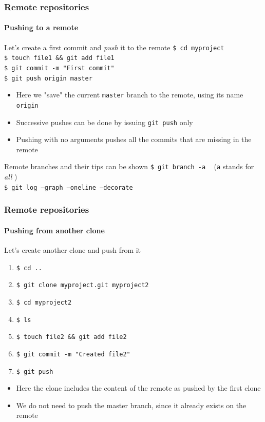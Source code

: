 \begin{frame}
\frametitle{Remote repositories}
\framesubtitle{Pushing to a remote}

\begin{block}{Let's create a first commit and {\em push} it to the remote}
\texttt{\$ cd myproject} \\
\texttt{\$ touch file1 \&\& git add file1} \\
\texttt{\$ git commit -m "First commit"} \\
\texttt{\$ git push origin master}

\begin{itemize}
\item Here we "save" the current \texttt{master} branch to the remote, using its name \texttt{origin}
\item Successive pushes can be done by issuing \texttt{git push} only
\item Pushing with no arguments pushes all the commits that are missing in the remote
\end{itemize}
\end{block}

\pause
\begin{block}{Remote branches and their tips can be shown}
\texttt{\$ git branch -a} \,\,\, (\texttt{a} stands for {\em all} ) \\
\texttt{\$ git log ---graph ---oneline ---decorate}
\end{block}

\end{frame}

\begin{frame}
\frametitle{Remote repositories}
\framesubtitle{Pushing from another clone}

\begin{block}{Let's create another clone and push from it}
\begin{enumerate}
\item \texttt{\$ cd ..}
\item \texttt{\$ git clone myproject.git myproject2}
\item \texttt{\$ cd myproject2}
\item \texttt{\$ ls}
\item \texttt{\$ touch file2 \&\& git add file2}
\item \texttt{\$ git commit -m "Created file2"}
\item \texttt{\$ git push}
\end{enumerate}
\begin{itemize}
\item Here the clone includes the content of the remote as pushed by the first clone
\item We do not need to push the master branch, since it already exists on the remote
\end{itemize}
\end{block}

\end{frame}

